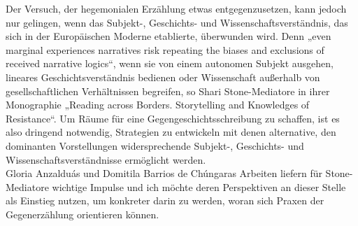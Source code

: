 \noindent Der Versuch, der hegemonialen Erzählung etwas entgegenzusetzen, kann jedoch nur
gelingen, wenn das Subjekt-, Geschichts- und Wissenschaftsverständnis, das sich
in der Europäischen Moderne etablierte, überwunden wird. Denn „even marginal
experiences narratives risk repeating the biases and exclusions of received
narrative logics“\footnotemark {}, wenn sie von einem autonomen Subjekt ausgehen, lineares
Geschichtsverständnis bedienen oder Wissenschaft außerhalb von
gesellschaftlichen Verhältnissen begreifen, so Shari Stone-Mediatore in ihrer
Monographie „Reading across Borders. Storytelling and Knowledges of
Resistance“\footnotemark {}. Um Räume für eine Gegengeschichtsschreibung zu schaffen, ist es
also dringend notwendig, Strategien zu entwickeln mit denen alternative, den
dominanten Vorstellungen widersprechende Subjekt-, Geschichts- und
Wissenschaftsverständnisse ermöglicht werden.\\
Gloria Anzalduás und Domitila Barrios de Chúngaras Arbeiten liefern für
Stone-Mediatore wichtige Impulse und ich möchte deren Perspektiven an dieser
Stelle als Einstieg nutzen, um konkreter darin zu werden, woran sich Praxen der
Gegenerzählung orientieren können.\\

